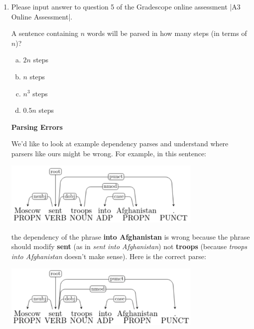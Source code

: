 \begin{enumerate}[1.]
\begin{enumerate}[4a.]

\end{enumerate}

\item {} Please input answer to question 5 of the Gradescope online assessment |A3 Online Assessment|.

A sentence containing $n$ words will be parsed in how many steps (in terms of $n$)?

\begin{enumerate}[(a)]
\item $2n$ steps
\item $n$ steps
\item $n^3$ steps
\item $0.5n$ steps
\end{enumerate}


{\bf Parsing Errors}

We'd like to look at example dependency parses and understand where parsers like ours might be wrong. For example, in this sentence:

\begin{center}
\includegraphics[width=0.75\textwidth]{6pre-1.png}
\end{center}

the dependency of the phrase {\bf into Afghanistan} is wrong because the phrase should modify {\bf sent} (as in {\em sent into Afghanistan}) not {\bf troops} (because {\em troops into Afghanistan} doesn't make sense). Here is the correct parse:

\begin{center}
\includegraphics[width=0.75\textwidth]{6pre-2.png}
\end{center}


\end{enumerate}
